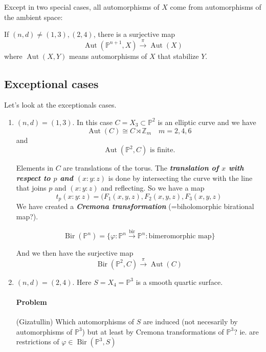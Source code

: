 \begin{thm}\leavevmode
	Except in two special cases, all automorphisms of $X$ come from automorphisms of the ambient space:
	
	If $(n,d)\neq (1,3),(2,4)$, there is a surjective map
	\[\operatorname{Aut}(\mathbb{P}^{n+1},X)\overset{\pi}{\longrightarrow}\operatorname{Aut}(X)\]
	where $\operatorname{Aut}(X,Y)$ means automorphisms of $X$ that stabilize  $Y$.
\end{thm}

\subsection{Exceptional cases}

Let's look at the exceptionals cases.

\begin{enumerate}
	\item $(n,d)=(1,3)$. In this case  $C=X_3\subset \mathbb{P}^2$ is an elliptic curve and we have
		\[\operatorname{Aut}(C)\cong C\rtimes \mathbb{Z}_m\quad m=2,4,6\]
and
 \[\operatorname{Aut}(\mathbb{P}^2,C)\text{ is finite.} \]

 Elements in $C$ are translations of the torus. The \textit{\textbf{translation of $x$ with respect to $p$ and $(x:y:z)$}} is done by intersecting the curve with the line that joins $p$ and $(x:y:z)$ and reflecting. So we have a map
  \[t_p(x:y:z)=(F_1(x,y,z),F_2(x,y,z),F_3(x,y,z)\]
  We have created a \textit{\textbf{Cremona transformation}} (=biholomorphic birational map?).
 
  \begin{defn}
	\[\operatorname{Bir}(\mathbb{P}^n)=\{\varphi :\mathbb{P}^n\overset{\operatorname{bir}}{\longrightarrow}\mathbb{P}^n:\text{bimeromorphic map} \}\]
\end{defn}

And we then have the surjective map
\[\operatorname{Bir}(\mathbb{P}^2,C)\overset{\pi}{\longrightarrow}\operatorname{Aut}(C)\]


	\item $(n,d)=(2,4)$. Here  $S=X_4=\mathbb{P}^3$ is a smooth quartic surface.

		\paragraph{Problem} (Gizatullin) Which automorphisms of $S$ are induced (not necesarily by automorphisms of $\mathbb{P}^3$) but at least by Cremona transformations of $\mathbb{P}^3$? ie. are restrictions of $\varphi\in\operatorname{Bir}(\mathbb{P}^3,S)$


\end{enumerate}
